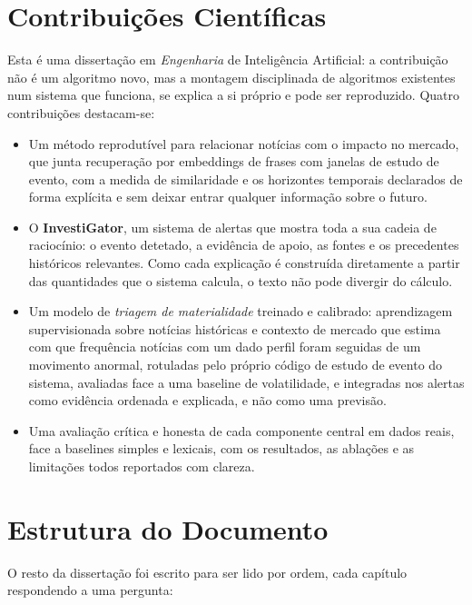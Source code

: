 \section{Contribuições Científicas}
\label{sec:intro_contributions}

Esta é uma dissertação em \emph{Engenharia} de Inteligência Artificial: a contribuição não é um algoritmo
novo, mas a montagem disciplinada de algoritmos existentes num sistema que funciona, se explica a si próprio
e pode ser reproduzido. Quatro contribuições destacam-se:

\begin{itemize}
  \item Um método reprodutível para relacionar notícias com o impacto no mercado, que junta recuperação por
        embeddings de frases com janelas de estudo de evento, com a medida de similaridade e os horizontes
        temporais declarados de forma explícita e sem deixar entrar qualquer informação sobre o futuro.
  \item O \textbf{InvestiGator}, um sistema de alertas que mostra toda a sua cadeia de raciocínio: o evento
        detetado, a evidência de apoio, as fontes e os precedentes históricos relevantes. Como cada
        explicação é construída diretamente a partir das quantidades que o sistema calcula, o texto não pode
        divergir do cálculo.
  \item Um modelo de \emph{triagem de materialidade} treinado e calibrado: aprendizagem supervisionada sobre
        notícias históricas e contexto de mercado que estima com que frequência notícias com um dado perfil
        foram seguidas de um movimento anormal, rotuladas pelo próprio código de estudo de evento do sistema,
        avaliadas face a uma baseline de volatilidade, e integradas nos alertas como evidência ordenada e
        explicada, e não como uma previsão.
  \item Uma avaliação crítica e honesta de cada componente central em dados reais, face a baselines simples e
        lexicais, com os resultados, as ablações e as limitações todos reportados com clareza.
\end{itemize}

\section{Estrutura do Documento}
\label{sec:intro_structure}

O resto da dissertação foi escrito para ser lido por ordem, cada capítulo respondendo a uma pergunta:


